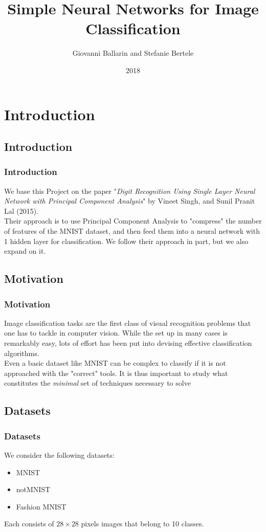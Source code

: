 \documentclass{beamer}
\title{Simple Neural Networks for Image Classification}
\author{Giovanni Ballarin and Stefanie Bertele}
\institute{Presentation}
\date{2018}
\begin{document}
\frame{\titlepage}

\section{Introduction}

\subsection{Introduction}

\begin{frame}
	\frametitle{Introduction}
	We base this Project on the paper "\textit{Digit Recognition Using Single Layer Neural Network with Principal Component Analysis}" by Vineet Singh, and Sunil Pranit Lal (2015). \\
	\vspace{1em}
	Their approach is to use Principal Component Analysis to "compress" the number of features of the MNIST dataset, and then feed them into a neural network with 1 hidden layer for classification. We follow their approach in part, but we also expand on it.
\end{frame}

\subsection{Motivation}

\begin{frame}
	\frametitle{Motivation}
	Image classification tasks are the first class of visual recognition problems that one has to tackle in computer vision. While the set up in many cases is remarkably easy, lots of effort has been put into devising effective classification algorithms. \\
	\vspace{2em}
	Even a basic dataset like MNIST can be complex to classify if it is not approached with the "correct" tools. It is thus important to study what constitutes the \textit{minimal} set of techniques necessary to solve 
\end{frame}

\subsection{Datasets}

\begin{frame}
	\frametitle{Datasets}
	We consider the following datasets:
	\vspace{1em}
	\begin{itemize}
		\item MNIST
		\vspace{1em}
		\item notMNIST
		\vspace{1em}
		\item Fashion MNIST
	\end{itemize}
	\vspace{1em}
	Each consists of $28\times28$ pixels images that belong to 10 classes.
\end{frame}
\end{document}
